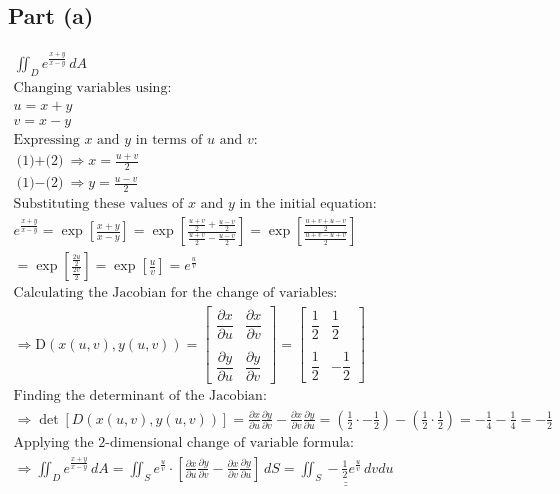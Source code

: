 \documentclass[letterpaper,10pt]{article}
\newcommand{\doubleu}[1]{\underline{\underline{#1}}}
\newcommand{\partiald}[2]{\frac{\partial #1}{\partial #2}}
\newcommand{\matrixpartiald}[2]{\dfrac{\partial #1}{\partial #2}}
\begin{document}
		\subsection{Part (a)}
			\begin{gather*}
				\iint_D e^{\frac{x+y}{x-y}} \, dA \\
				\text{Changing variables using:} \\
				u = x + y \tag{1} \\
				v = x - y \tag{2} \\
				\text{Expressing $x$ and $y$ in terms of $u$ and $v$:} \\
				\text{(1)$+$(2)} \Rightarrow x = \frac{u+v}{2} \\
				\text{(1)$-$(2)} \Rightarrow y = \frac{u-v}{2} \\
				\text{Substituting these values of $x$ and $y$ in the initial equation:} \\
				e^{\frac{x+y}{x-y}} = \exp{\left[ \frac{x+y}{x-y} \right]} = \exp{ \left[ \frac{ \frac{u+v}{2} + \frac{u-v}{2} }{ \frac{u+v}{2} - \frac{u-v}{2} } \right]} = \exp{ \left[ \frac{ \frac{u+v+u-v}{2} }{ \frac{u+v-u+v}{2} } \right]} \\
				= \exp {\left[ \frac{ \frac{2u}{2} }{ \frac{2v}{2} } \right]} = \exp{\left[ \frac{u}{v} \right]} = e^{\frac{u}{v}} \\
				\text{Calculating the Jacobian for the change of variables:} \\
				\Rightarrow \text{D}(x(u,v), y(u,v)) =
				\begin{bmatrix}
					\matrixpartiald{x}{u} & \matrixpartiald{x}{v} \\
					\\
					\matrixpartiald{y}{u} & \matrixpartiald{y}{v}
				\end{bmatrix}
				=
				\begin{bmatrix}
					\dfrac{1}{2} & \dfrac{1}{2} \\
					\\
					\dfrac{1}{2} & -\dfrac{1}{2}
				\end{bmatrix} \\
				\text{Finding the determinant of the Jacobian:} \\
				\Rightarrow \det \left[ D(x(u,v), y(u,v)) \right] = \partiald{x}{u}\partiald{y}{v} - \partiald{x}{v}\partiald{y}{u} = \left( \frac{1}{2} \cdot -\frac{1}{2} \right) - \left( \frac{1}{2} \cdot \frac{1}{2} \right) = -\frac{1}{4} - \frac{1}{4} = -\frac{1}{2} \\
				\text{Applying the 2-dimensional change of variable formula:} \\
				\Rightarrow \iint_D e^{\frac{x+y}{x-y}} \, dA = \iint_S e^{\frac{u}{v}} \cdot \left[ \partiald{x}{u}\partiald{y}{v} - \partiald{x}{v}\partiald{y}{u} \right] \, dS = \doubleu{ \iint_S -\frac{1}{2} e^{\frac{u}{v}} \, dvdu }
			\end{gather*}
\end{document}
